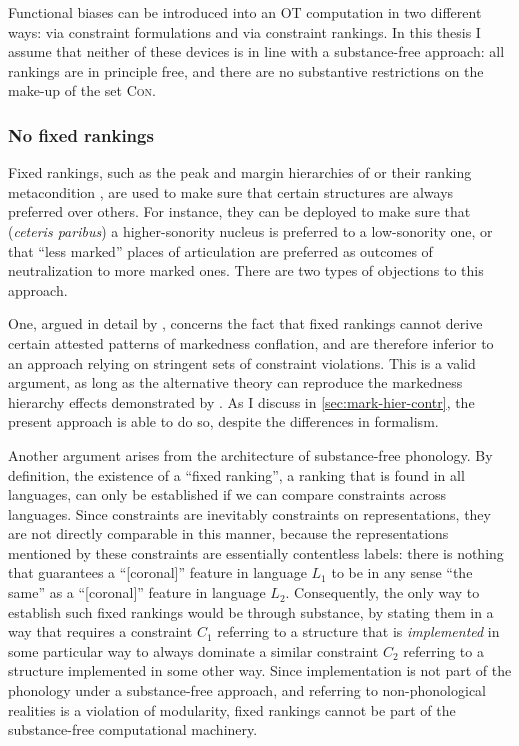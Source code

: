Functional biases can be introduced into an OT computation in two different ways: via constraint formulations and via constraint rankings. In this thesis I assume that neither of these devices is in line with a substance\hyp free approach: all rankings are in principle free, and there are no substantive restrictions on the make\hyp up of the set \textsc{Con}.

\subsubsection{No fixed rankings}
\label{sec:no-fixed-rankings}

Fixed rankings, such as the peak and margin hierarchies of \citet{ot} or their ranking metacondition , are used to make sure that certain structures are always preferred over others. For instance, they can be deployed to make sure that (\emph{ceteris paribus}) a higher\hyp sonority nucleus is preferred to a low\hyp sonority one, or that \enquote{less marked} places of articulation are preferred as outcomes of neutralization to more marked ones. There are two types of objections to this approach.

One, argued in detail by \citet[§§5.2.2, 5.4, 6.2.3]{delacy2006}, concerns the fact that fixed rankings cannot derive certain attested patterns of markedness conflation, and are therefore inferior to an approach relying on stringent sets of constraint violations. This is a valid argument, as long as the alternative theory can reproduce the markedness hierarchy effects demonstrated by \citet{delacy2006}. As I discuss in \cref{sec:mark-hier-contr}, the present approach is able to do so, despite the differences in formalism.

Another argument arises from the architecture of substance\hyp free phonology. By definition, the existence of a \enquote{fixed ranking}, \ie a ranking that is found in all languages, can only be established if we can compare constraints across languages. Since constraints are inevitably constraints on representations, they are not directly comparable in this manner, because the representations mentioned by these constraints are essentially contentless labels: there is nothing that guarantees a \enquote{[coronal]} feature in language $L_{1}$ to be in any sense \enquote{the same} as a \enquote{[coronal]} feature in language $L_{2}$. Consequently, the only way to establish such fixed rankings would be through substance, by stating them in a way that requires a constraint $C_{1}$ referring to a structure that is \emph{implemented} in some particular way to always dominate a similar constraint $C_{2}$ referring to a structure implemented in some other way. Since implementation is not part of the phonology under a substance\hyp free approach, and referring to non\hyp phonological realities is a violation of modularity, fixed rankings cannot be part of the substance\hyp free computational machinery.

